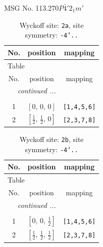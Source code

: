 \documentclass[fleqn,8pt]{jsarticle}
\begin{document}
\setcounter{MaxMatrixCols}{32}

\renewcommand{\tablename}{Table~}
\renewcommand{\figurename}{Figure~}
\begin{center}
\LARGE
MSG No. 113.270\quad$P\bar{4}'2_{1}m'$
\end{center}
\renewcommand{\arraystretch}{1.2}
\begin{longtable}{ccc}
\caption{Wyckoff site: {\tt 2a}, site symmetry: {\tt -4'..}}
 \\
 \hline \hline
No. & position & mapping \\ \hline \endfirsthead

\multicolumn{2}{l}{\tablename\ \thetable{}} \\
 \hline \hline
No. & position & mapping \\ \hline \endhead

 \hline \hline
\multicolumn{2}{r}{\footnotesize\it continued ...} \\ \endfoot

 \hline \hline
\multicolumn{2}{r}{} \\ \endlastfoot

1 & $\left[ 0,\, 0,\, 0 \right]$ & {\tt [1,4,5,6]} \\ \hline
2 & $\left[ \frac{1}{2},\, \frac{1}{2},\, 0 \right]$ & {\tt [2,3,7,8]} \\
\end{longtable}
\renewcommand{\arraystretch}{1.2}
\begin{longtable}{ccc}
\caption{Wyckoff site: {\tt 2b}, site symmetry: {\tt -4'..}}
 \\
 \hline \hline
No. & position & mapping \\ \hline \endfirsthead

\multicolumn{2}{l}{\tablename\ \thetable{}} \\
 \hline \hline
No. & position & mapping \\ \hline \endhead

 \hline \hline
\multicolumn{2}{r}{\footnotesize\it continued ...} \\ \endfoot

 \hline \hline
\multicolumn{2}{r}{} \\ \endlastfoot

1 & $\left[ 0,\, 0,\, \frac{1}{2} \right]$ & {\tt [1,4,5,6]} \\ \hline
2 & $\left[ \frac{1}{2},\, \frac{1}{2},\, \frac{1}{2} \right]$ & {\tt [2,3,7,8]} \\
\end{longtable}
\end{document}
